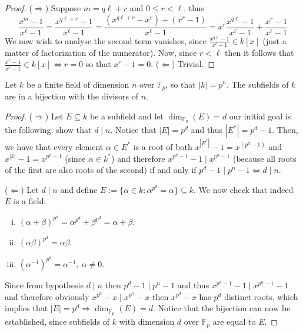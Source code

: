 \begin{proof}
    (\(\Rightarrow\)) Suppose \(m = q\ell + r\) and  \(0 \leqslant r < \ell\),
    thus
    \[
        \frac{x^m - 1}{x^\ell - 1} = \frac{x^{q\ell + r} - 1}{x^\ell - 1}
        = \frac{(x^{q \ell + r} - x^r) + (x^r - 1)}{x^\ell - 1}
        = x^r\frac{x^{q\ell} - 1}{x^\ell - 1} + \frac{x^r - 1}{x^\ell - 1}
    \]
    We now wish to analyse the second term vanishes, since \(\frac{x^{q\ell} -
        1}{x^\ell - 1} \in k[x]\) (just a matter of factorization of the numerator).
    Now, since \(r < \ell\) then it follows that \(\frac{x^r - 1}{x^\ell - 1} \in
    k[x] \Leftrightarrow r = 0\) so that \(x^r - 1 = 0\). (\(\Leftarrow\))
    Trivial.
\end{proof}

\begin{proposition}
    Let \(k\) be a finite field of dimension \(n\) over \(\mathbb{F}_p\), so that
    \(|k| = p^n\). The subfields of \(k\) are in a bijection with the divisors of
    \(n\).
\end{proposition}

\begin{proof}
    (\(\Rightarrow\)) Let \(E \subseteq k\) be a subfield and let
    \(\dim_{\mathbb{F}_p}(E) = d\) our initial goal is the following: show that
    \(d \mid n\). Notice that \(|E| = p^d\) and thus \(|E^\ast| = p^d - 1\).
    Then, we have that every element \(\alpha \in E^\ast\) is a root of both
    \(x^{|E^\ast|} - 1 = x^{(p^d - 1)}\) and \(x^{|k|} - 1 = x^{p^n - 1}\) (since
    \(\alpha \in k^\ast\)) and therefore \(x^{p^d - 1}- 1 \mid x^{p^n - 1}\)
    (because all roots of the first are also roots of the second) if and only if \(p^d - 1
    \mid p^n-1 \Leftrightarrow d \mid n\).

    (\(\Leftarrow\)) Let \(d \mid n\) and define \(E := \{\alpha \in k :
    \alpha^{p^d} = \alpha\} \subseteq k\). We now check that indeed \(E\) is a
    field:
    \begin{enumerate}[i.]
        \item \((\alpha + \beta)^{p^d} = \alpha^{p^d} + \beta^{p^d} = \alpha +
              \beta\).
        \item \((\alpha\beta)^{p^d} = \alpha\beta\).
        \item \((\alpha^{-1})^{p^d} = \alpha^{-1},\ \alpha \neq 0\).
    \end{enumerate}
    Since from hypothesis \(d \mid n\) then \(p^d - 1 \mid p^n - 1\) and thus
    \(x^{p^d-1}- 1 \mid x^{p^n-1}-1\) and therefore obviously \(x^{p^d} - x \mid
    x^{p^n} - x\) then \(x^{p^d} - x\) has \(p^d\) distinct roots, which implies
    that \(|E| = p^d \Rightarrow \dim_{\mathbb{F}_p}(E) = d\). Notice that the
    bijection can now be established, since subfields of \(k\) with dimension
    \(d\) over \(\mathbb{F}_p\) are equal to \(E\).
\end{proof}


